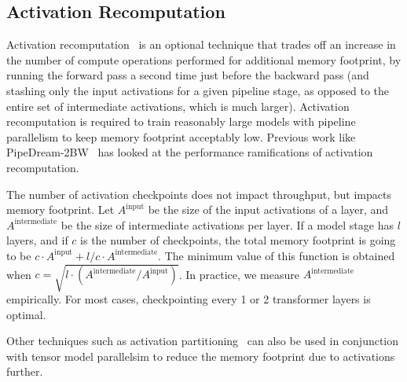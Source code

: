 \vspace{0.1in}
\noindent{}

\subsection{Activation Recomputation}

Activation recomputation~\cite{huang2019gpipe, chen2016training, griewank2000algorithm, mlsys2020_196} is an optional technique that trades off an increase in the number of compute operations performed for additional memory footprint, by running the forward pass a second time just before the backward pass (and stashing only the input activations for a given pipeline stage, as opposed to the entire set of intermediate activations, which is much larger). Activation recomputation is required to train reasonably large models with pipeline parallelism to keep memory footprint acceptably low. Previous work like PipeDream-2BW~\cite{narayanan2021memory} has looked at the performance ramifications of activation recomputation. 

The number of activation checkpoints does not impact throughput, but impacts memory footprint. Let $A^\text{input}$ be the size of the input activations of a layer, and $A^\text{intermediate}$ be the size of intermediate activations per layer. If a model stage has $l$ layers, and if $c$ is the number of checkpoints, the total memory footprint is going to be $c \cdot A^\text{input} + l/c \cdot A^\text{intermediate}$. The minimum value of this function is obtained when $c = \sqrt{l \cdot \left(A^\text{intermediate} / A^\text{input}\right)}$. In practice, we measure $A^\text{intermediate}$ empirically. For most cases, checkpointing every 1 or 2 transformer layers is optimal.

Other techniques such as activation partitioning~\cite{rajbhandari2019zero} can also be used in conjunction with tensor model parallelsim to reduce the memory footprint due to activations further.